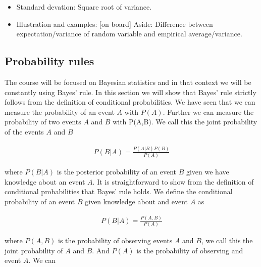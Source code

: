 \begin{itemize}
\item Standard devation: Square root of variance.
\item Illustration and examples: [on board]
Aside: Difference between expectation/variance of random variable and empirical average/variance.

\end{itemize}

\subsection{Probability rules}
The course will be focused on Bayesian statistics and in that context we will be constantly using Bayes' rule. In this section we will show that Bayes' rule strictly follows from the definition of conditional probabilities. We have seen that we can measure the probability of an event $A$ with $P(A)$. Further we can measure the probability of two events $A$ and $B$ with P(A,B). We call this the joint probability of the events $A$ and $B$

\begin{align}
	P(B|A) = \frac{P(A|B) P(B)}{P(A)}
\end{align}

where $P(B|A)$ is the posterior probability of an event $B$ given we have knowledge about an event $A$. It is straightforward to show from the definition of conditional probabilities that Bayes' rule holds. We define the conditional probability of an event $B$ given knowledge about and event $A$ as

\begin{align}
	P(B|A) = \frac{P(A,B)}{P(A)}
\end{align}

where $P(A,B)$ is the  probability of observing events $A$ and $B$, we call this the joint probability of $A$ and $B$. And $P(A)$ is the probability of observing and event $A$. We can  

